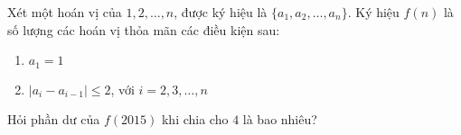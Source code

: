 \ifshowproblem
\begin{problem}\label{example:TWN-2015-TST3-Q2-P2}
    Xét một hoán vị của \( 1, 2, \ldots, n \), được ký hiệu là \( \{a_1, a_2, \ldots, a_n\} \).  
    Ký hiệu \( f(n) \) là số lượng các hoán vị thỏa mãn các điều kiện sau:
    \begin{enumerate}[topsep=0pt, partopsep=0pt, itemsep=0pt]
        \item \( a_1 = 1 \)
        \item \( |a_i - a_{i-1}| \le 2 \), với \( i = 2, 3, \ldots, n \)
    \end{enumerate}
    
    Hỏi phần dư của \( f(2015) \) khi chia cho \( 4 \) là bao nhiêu?
\end{problem}
\fi

\footnotemark
{}
\fi